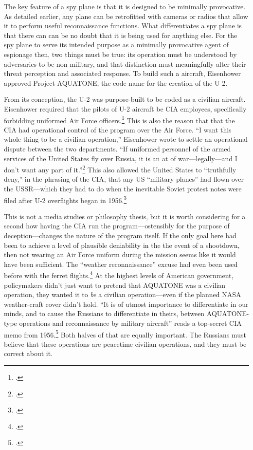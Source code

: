 \documentclass{report}
\begin{document}
\begin{refsegment}
The key feature of a spy plane is that it is designed to be minimally provocative. As detailed earlier, any plane can be retrofitted with cameras or radios that allow it to perform useful reconnaissance functions. What differentiates a spy plane is that there can can be no doubt that it is being used for anything else. For the spy plane to serve its intended purpose as a minimally provocative agent of espionage then, two things must be true: its operation must be understood by adversaries to be non-military, and that distinction must meaningfully alter their threat perception and associated response. To build such a aircraft, Eisenhower approved Project AQUATONE, the code name for the creation of the U-2.

From its conception, the U-2 was purpose-built to be coded as a civilian aircraft. Eisenhower required that the pilots of U-2 aircraft be CIA employees, specifically forbidding uniformed Air Force officers.\footcite[p.~33]{lindgren_trust_2000} This is also the reason that that the CIA had operational control of the program over the Air Force. ``I want this whole thing to be a civilian operation,'' Eisenhower wrote to settle an operational dispute between the two departments. ``If uniformed personnel of the armed services of the United States fly over Russia, it is an at of war---legally---and I don't want any part of it.''\footcite[p.~60. The original source for this quote is an \emph{OSA History} that requires codeword clearance. It is quoted here by the History Staff of the CIA.]{pedlow_cia_1998} This also allowed the United States to ``truthfully deny,'' in the phrasing of the CIA, that any US ``military planes'' had flown over the USSR---which they had to do when the inevitable Soviet protest notes were filed after U-2 overflights began in 1956.\footcite[p.~109]{pedlow_cia_1998}

This is not a media studies or philosophy thesis, but it is worth considering for a second how having the CIA run the program---ostensibly for the purpose of deception---changes the nature of the program itself. If the only goal here had been to achieve a level of plausible deniability in the the event of a shootdown, then not wearing an Air Force uniform during the mission seems like it would have been sufficient. The ``weather reconnaissance'' excuse had even been used before with the ferret flights.\footcite[p.~45]{farquhar_aerial_2015} At the highest levels of American government, policymakers didn't just want to pretend that AQUATONE was a civilian operation, they wanted it to \emph{be} a civilian operation---even if the planned NASA weather-craft cover didn't hold. ``It is of utmost importance to differentiate in our minds, and to cause the Russians to differentiate in theirs, between AQUATONE-type operations and reconnaissance by military aircraft'' reads a top-secret CIA memo from 1956.\footcite[p.~1]{miller_suggestions_1956} Both halves of that are equally important. The Russians must believe that these operations are peacetime civilian operations, and they must be correct about it.


\end{refsegment}
\end{document}

